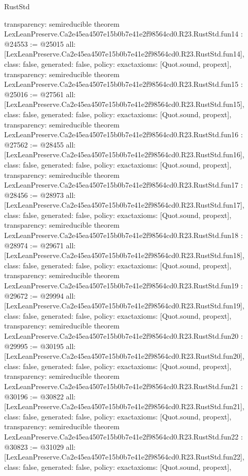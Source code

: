 \begin{lexlean}{RustStd}
\begin{coremodule}
{  transparency: semireducible
}
theorem LexLeanPreserve.Ca2e45ea4507e15b0b7e41e2f98564cd0.R23.RustStd.fun14 : @24553 := @25015 {
  all: [LexLeanPreserve.Ca2e45ea4507e15b0b7e41e2f98564cd0.R23.RustStd.fun14],
  class: false,
  generated: false,
  policy: exact{axioms: [Quot.sound, propext]},
  transparency: semireducible
}
theorem LexLeanPreserve.Ca2e45ea4507e15b0b7e41e2f98564cd0.R23.RustStd.fun15 : @25016 := @27561 {
  all: [LexLeanPreserve.Ca2e45ea4507e15b0b7e41e2f98564cd0.R23.RustStd.fun15],
  class: false,
  generated: false,
  policy: exact{axioms: [Quot.sound, propext]},
  transparency: semireducible
}
theorem LexLeanPreserve.Ca2e45ea4507e15b0b7e41e2f98564cd0.R23.RustStd.fun16 : @27562 := @28455 {
  all: [LexLeanPreserve.Ca2e45ea4507e15b0b7e41e2f98564cd0.R23.RustStd.fun16],
  class: false,
  generated: false,
  policy: exact{axioms: [Quot.sound, propext]},
  transparency: semireducible
}
theorem LexLeanPreserve.Ca2e45ea4507e15b0b7e41e2f98564cd0.R23.RustStd.fun17 : @28456 := @28973 {
  all: [LexLeanPreserve.Ca2e45ea4507e15b0b7e41e2f98564cd0.R23.RustStd.fun17],
  class: false,
  generated: false,
  policy: exact{axioms: [Quot.sound, propext]},
  transparency: semireducible
}
theorem LexLeanPreserve.Ca2e45ea4507e15b0b7e41e2f98564cd0.R23.RustStd.fun18 : @28974 := @29671 {
  all: [LexLeanPreserve.Ca2e45ea4507e15b0b7e41e2f98564cd0.R23.RustStd.fun18],
  class: false,
  generated: false,
  policy: exact{axioms: [Quot.sound, propext]},
  transparency: semireducible
}
theorem LexLeanPreserve.Ca2e45ea4507e15b0b7e41e2f98564cd0.R23.RustStd.fun19 : @29672 := @29994 {
  all: [LexLeanPreserve.Ca2e45ea4507e15b0b7e41e2f98564cd0.R23.RustStd.fun19],
  class: false,
  generated: false,
  policy: exact{axioms: [Quot.sound, propext]},
  transparency: semireducible
}
theorem LexLeanPreserve.Ca2e45ea4507e15b0b7e41e2f98564cd0.R23.RustStd.fun20 : @29995 := @30195 {
  all: [LexLeanPreserve.Ca2e45ea4507e15b0b7e41e2f98564cd0.R23.RustStd.fun20],
  class: false,
  generated: false,
  policy: exact{axioms: [Quot.sound, propext]},
  transparency: semireducible
}
theorem LexLeanPreserve.Ca2e45ea4507e15b0b7e41e2f98564cd0.R23.RustStd.fun21 : @30196 := @30822 {
  all: [LexLeanPreserve.Ca2e45ea4507e15b0b7e41e2f98564cd0.R23.RustStd.fun21],
  class: false,
  generated: false,
  policy: exact{axioms: [Quot.sound, propext]},
  transparency: semireducible
}
theorem LexLeanPreserve.Ca2e45ea4507e15b0b7e41e2f98564cd0.R23.RustStd.fun22 : @30823 := @31029 {
  all: [LexLeanPreserve.Ca2e45ea4507e15b0b7e41e2f98564cd0.R23.RustStd.fun22],
  class: false,
  generated: false,
  policy: exact{axioms: [Quot.sound, propext]},
}
\end{coremodule}
\end{lexlean}
